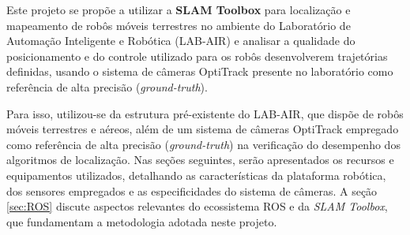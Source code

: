 


\label{Cap03:Metodologia}
Este projeto se propõe a utilizar a \textbf{SLAM Toolbox} para localização e mapeamento de robôs móveis terrestres no ambiente do Laboratório de Automação Inteligente e Robótica (LAB-AIR) e analisar a qualidade do posicionamento e do controle utilizado para os robôs desenvolverem trajetórias definidas, usando o sistema de câmeras OptiTrack presente no laboratório como referência de alta precisão (\textit{ground-truth}).

Para isso, utilizou-se da estrutura pré-existente do LAB-AIR, que dispõe de robôs móveis terrestres e aéreos, além de um sistema de câmeras OptiTrack empregado como referência de alta precisão (\textit{ground-truth}) na verificação do desempenho dos algoritmos de localização. 
Nas seções seguintes, serão apresentados os recursos e equipamentos utilizados, detalhando as características da plataforma robótica, dos sensores empregados e as especificidades do sistema de câmeras. A seção \ref{sec:ROS} discute aspectos relevantes do ecossistema ROS e da \textit{SLAM Toolbox}, que fundamentam a metodologia adotada neste projeto.


